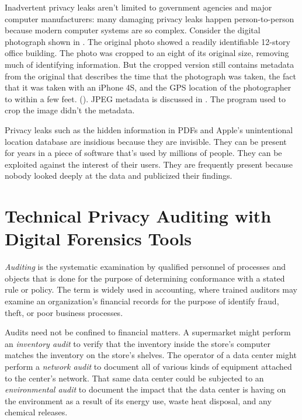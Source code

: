Inadvertent privacy leaks aren't limited to government agencies and
major computer manufacturers: many damaging privacy leaks happen
person-to-person because modern computer systems are so
complex. Consider the digital photograph shown in . The
original photo showed a readily
identifiable 12-story office building. The photo was cropped to an
eight of its original size, removing much of identifying information. But the cropped
version still contains metadata from the original that
describes the time that the photograph was taken, the fact that it was
taken with an iPhone 4S, and the GPS location of the
photographer to within a few feet. (). JPEG
metadata is discussed in . The program used to crop
the image didn't the metadata.



Privacy leaks such as the hidden information in PDFs and Apple's
unintentional location database are insidious because they are
invisible. They can be present for years in a piece of software that's
used by millions of people. They can be exploited against the interest
of their users. They are frequently present because nobody looked
deeply at the data and publicized their findings. 


\section{Technical Privacy Auditing with Digital Forensics Tools \INDEV}

\emph{Auditing} is the systematic examination by qualified personnel of processes and
objects that is done for the purpose of determining conformance with a
stated rule or policy. 
The term is widely used in accounting, where
trained auditors may examine an organization's financial records for
the purpose of identify fraud, theft, or poor business processes. 

Audits need not be confined to financial matters.  A supermarket might
perform an \emph{inventory audit} to verify that the inventory inside
the store's computer matches the inventory on the store's shelves. The
operator of a data center might perform a \emph{network audit} to document all of
various kinds of equipment attached to the center's network. That same
data center could be subjected to an \emph{environmental audit} to
document the impact that the data center is having on the environment
as a result of its energy use, waste heat disposal, and any chemical
releases. 

